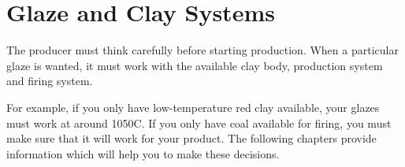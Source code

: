 \section{Glaze and Clay Systems}
The producer must think carefully before starting production. When a particular 
glaze is wanted, it must work with the available clay body, production system 
and firing system. 

For example, if you only have low-temperature red clay available, your glazes 
must work at around 1050\degree C. If you only have coal available for firing, 
you must make sure that it will work for your product. The following chapters 
provide information which will help you to make these decisions.
